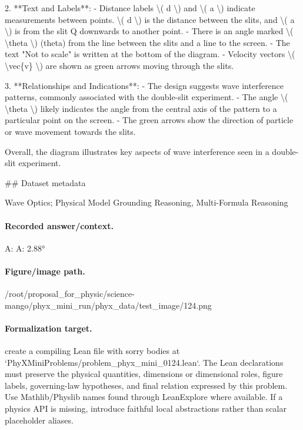 2. **Text and Labels**:
   - Distance labels \textbackslash{}( d \textbackslash{}) and \textbackslash{}( a \textbackslash{}) indicate measurements between points. \textbackslash{}( d \textbackslash{}) is the distance between the slits, and \textbackslash{}( a \textbackslash{}) is from the slit Q downwards to another point.
   - There is an angle marked \textbackslash{}( \textbackslash{}theta \textbackslash{}) (theta) from the line between the slits and a line to the screen.
   - The text "Not to scale" is written at the bottom of the diagram.
   - Velocity vectors \textbackslash{}( \textbackslash{}vec\{v\} \textbackslash{}) are shown as green arrows moving through the slits.
  
3. **Relationships and Indications**:
   - The design suggests wave interference patterns, commonly associated with the double-slit experiment.
   - The angle \textbackslash{}( \textbackslash{}theta \textbackslash{}) likely indicates the angle from the central axis of the pattern to a particular point on the screen.
   - The green arrows show the direction of particle or wave movement towards the slits.

Overall, the diagram illustrates key aspects of wave interference seen in a double-slit experiment.

\#\# Dataset metadata

Wave Optics; Physical Model Grounding Reasoning, Multi-Formula Reasoning

\paragraph{Recorded answer/context.}
A: A: 2.88°

\paragraph{Figure/image path.}
/root/proposal\_for\_physic/science-mango/phyx\_mini\_run/phyx\_data/test\_image/124.png

\paragraph{Formalization target.}
create a compiling Lean file with sorry bodies at `PhyXMiniProblems/problem\_phyx\_mini\_0124.lean`. The Lean declarations must preserve the physical quantities, dimensions or dimensional roles, figure labels, governing-law hypotheses, and final relation expressed by this problem.
Use Mathlib/Physlib names found through LeanExplore where available. If a physics API is missing, introduce faithful local abstractions rather than scalar placeholder aliases.


